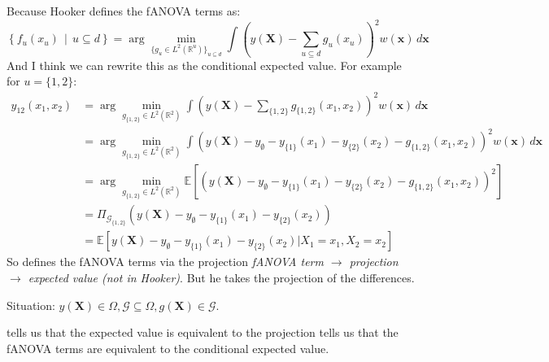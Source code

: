 Because Hooker defines the fANOVA terms as:
\begin{equation}
\left\{ f_u(x_u) \,\middle|\, u \subseteq d \right\}
= \arg\min_{\{g_u \in L^2(\mathbb{R}^u)\}_{u \subseteq d}} 
\int \left( y(\boldsymbol{X}) - \sum_{u \subseteq d} g_u(x_u) \right)^2 w(\boldsymbol{x}) \, d\boldsymbol{x}
\label{eq:fanova_decomposition_generalized}
\end{equation}
And I think we can rewrite this as the conditional expected value. For example for $u = \{1,2\}$:
\begin{align*}
    y_{12}(x_1, x_2) &= \arg \min_{g_{\{1,2\}} \in L^2(\mathbb{R}^2)} \int \left( y(\boldsymbol{X}) - \sum_{\{1,2\}} g_{\{1,2\}}(x_1, x_2) \right)^2 w(\boldsymbol{x}) \, d\boldsymbol{x} \\
    &= \arg \min_{g_{\{1,2\}} \in L^2(\mathbb{R}^2)} \int \left( y(\boldsymbol{X}) - y_\emptyset - y_{\{1\}}(x_1) - y_{\{2\}}(x_2) - g_{\{1,2\}}(x_1, x_2) \right)^2 w(\boldsymbol{x}) \, d\boldsymbol{x} \\
    &= \arg \min_{g_{\{1,2\}} \in L^2(\mathbb{R}^2)} \mathbb{E}[(y(\boldsymbol{X}) - y_\emptyset - y_{\{1\}}(x_1) - y_{\{2\}}(x_2) - g_{\{1,2\}}(x_1, x_2))^2] \\
    &= \Pi_{\mathcal{G}_{\{1,2\}}}(y(\boldsymbol{X}) - y_\emptyset - y_{\{1\}}(x_1) - y_{\{2\}}(x_2)) \\
    &= \mathbb{E}[y(\boldsymbol{X}) - y_{\emptyset} - y_{\{1\}}(x_1) - y_{\{2\}}(x_2) | X_1 = x_1, X_2 = x_2]
\end{align*}
So \cite{hooker2007} defines the fANOVA terms via the projection \textit{fANOVA term $\rightarrow$ projection $\rightarrow$ expected value (not in Hooker)}. But he takes the projection of the differences. 

\vspace{5cm}
Situation: $y(\boldsymbol{X}) \in \Omega, \mathcal{G} \subseteq \Omega, g(\boldsymbol{X}) \in \mathcal{G}$.\par
\cite{Vaart_1998} tells us that the expected value is equivalent to the projection \cite{muehlenstaedt2012} tells us that the fANOVA terms are equivalent to the conditional expected value.\par

